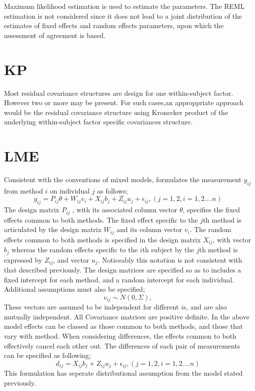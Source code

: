\documentclass[12pt, a4paper]{report}
\theoremstyle{plain}
\theoremstyle{definition}
\theoremstyle{remark}
\begin{document}
Maximum likelihood estimation is used to estimate the parameters.
The REML estimation is not considered since it does not lead to a
joint distribution of the estimates of fixed effects and random
effects parameters, upon which the assessment of agreement is
based.



\section{KP}
Most residual covariance structures are design for one
within-subject factor. However two or more may be present. For
such cases,an approppriate approach would be the residual
covariance structure using Kronecker product of the underlying
within-subject factor specific covariances structure.

\section{LME}
Consistent with the conventions of mixed models, \citet{pkc}
formulates the measurement $y_{ij} $from method $i$ on individual
$j$ as follows;
\begin{equation}
y_{ij} =P_{ij}\theta + W_{ij}v_{i} + X_{ij}b_{j} + Z_{ij}u_{j} +
\epsilon_{ij},     (j=1,2, i=1,2....n)
\end{equation}
The design matrix $P_{ij}$ , with its associated column vector
$\theta$, specifies the fixed effects common to both methods. The
fixed effect specific to the $j$th method is articulated by the
design matrix $W_{ij}$ and its column vector $v_{i}$. The random
effects common to both methods is specified in the design matrix
$X_{ij}$, with vector $b_{j}$ whereas the random effects specific
to the $i$th subject by the $j$th method is expressed by $Z_{ij}$,
and vector $u_{j}$. Noticeably this notation is not consistent
with that described previously.  The design matrices are specified
so as to includes a fixed intercept for each method, and a random
intercept for each individual. Additional assumptions must also be
specified;
\begin{equation}
v_{ij} \sim N(0,\Sigma),
\end{equation}
These vectors are assumed to be independent for different $i$s,
and are also mutually independent. All Covariance matrices are
positive definite.  In the above model effects can be classed as
those common to both methods, and those that vary with method.
When considering differences, the effects common to both
effectively cancel each other out. The differences of each pair of
measurements can be specified as following;
\begin{equation}
d_{ij} = X_{ij}b_{j} + Z_{ij}u_{j} + \epsilon_{ij},     (j=1,2,
i=1,2....n)
\end{equation}
This formulation has seperate distributional assumption from the
model stated previously.
\end{document}
